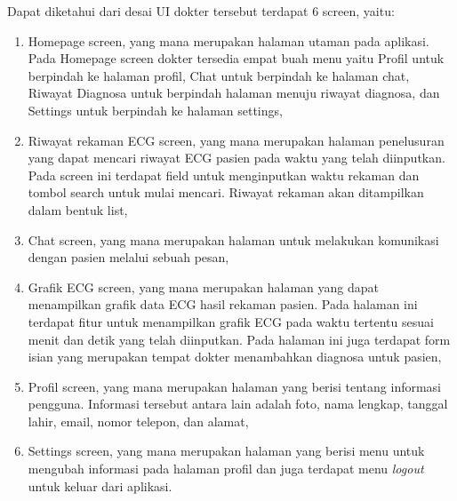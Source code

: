 Dapat diketahui dari desai UI dokter tersebut terdapat 6 screen, yaitu:
\begin{enumerate}
	\vspace{0mm}
	\item Homepage screen, yang mana merupakan halaman utaman pada aplikasi. Pada Homepage screen dokter tersedia empat buah menu yaitu Profil untuk berpindah ke halaman profil, Chat untuk berpindah ke halaman chat, Riwayat Diagnosa untuk berpindah halaman menuju riwayat diagnosa, dan Settings untuk berpindah ke halaman settings,
	\vspace{0mm}
	\item Riwayat rekaman ECG screen, yang mana merupakan halaman penelusuran yang dapat mencari riwayat ECG pasien pada waktu yang telah diinputkan. Pada screen ini terdapat field untuk menginputkan waktu rekaman dan tombol search untuk mulai mencari. Riwayat rekaman akan ditampilkan dalam bentuk list,
	\vspace{0mm}
	\item Chat screen, yang mana merupakan halaman untuk melakukan komunikasi dengan pasien melalui sebuah pesan,
	\vspace{0mm}
	\item Grafik ECG screen, yang mana merupakan halaman yang dapat menampilkan grafik data ECG hasil rekaman pasien. Pada halaman ini terdapat fitur untuk menampilkan grafik ECG pada waktu tertentu sesuai menit dan detik yang telah diinputkan. Pada halaman ini juga terdapat form isian yang merupakan tempat dokter menambahkan diagnosa untuk pasien,
	\vspace{0mm}
	\item Profil screen, yang mana merupakan halaman yang berisi tentang informasi pengguna. Informasi tersebut antara lain adalah foto, nama lengkap, tanggal lahir, email, nomor telepon, dan alamat,
	\vspace{0mm}
	\item Settings screen, yang mana merupakan halaman yang berisi menu untuk mengubah informasi pada halaman profil dan juga terdapat menu \textit{logout} untuk keluar dari aplikasi.
\end{enumerate}


